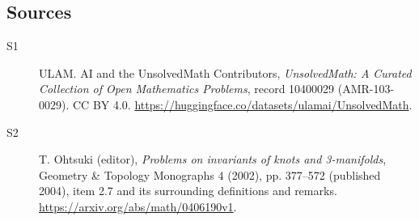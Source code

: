 \documentclass[11pt]{article}
\begin{document}
\subsection{Sources}
\begin{description}
\item[\hypertarget{source:10400029:1}{S1}] ULAM. AI and the UnsolvedMath Contributors, \emph{UnsolvedMath: A Curated Collection of Open Mathematics Problems}, record 10400029 (AMR-103-0029). CC BY 4.0. \url{https://huggingface.co/datasets/ulamai/UnsolvedMath}.
\item[\hypertarget{source:10400029:2}{S2}] T. Ohtsuki (editor), \emph{Problems on invariants of knots and 3-manifolds}, Geometry \& Topology Monographs 4 (2002), pp. 377--572 (published 2004), item 2.7 and its surrounding definitions and remarks. \url{https://arxiv.org/abs/math/0406190v1}.
\end{description}
\label{end:10400029}
\end{document}
